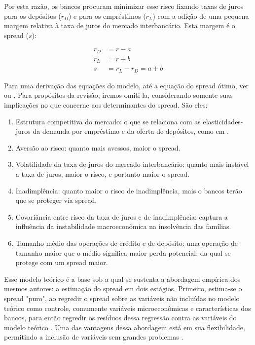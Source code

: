 \documentclass[a4paper,
               article,
               12pt,
               openany,
               oneside,
               english,
               brazil]{abntex2}
\numberwithin{equation}{section}
\begin{document}
    Por esta razão, os bancos procuram minimizar esse risco fixando taxas de juros para os depósitos ($r_D$) e para os empréstimos ($r_L$) com a adição de uma pequena margem relativa à taxa de juros do mercado interbancário. Esta margem é o spread ($s$):

	\begin{align}
        r_D &= r - a \\
        r_L &= r + b \\
        s &= r_L - r_D = a + b
	\end{align}

    Para uma derivação das equações do modelo, até a equação do spread ótimo, ver \textcite[p.~2262]{maudos} ou \textcite[p.~584]{hoesaunders}. Para propósitos da revisão, iremos omiti-la, considerando somente suas implicações no que concerne aos determinantes do spread. São eles:

	\begin{enumerate}
		\item Estrutura competitiva do mercado: o que se relaciona com as elasticidades-juros da demanda por empréstimo e da oferta de depósitos, como em \textcite{klein}.
		\item Aversão ao risco: quanto mais avessos, maior o spread.
		\item Volatilidade da taxa de juros do mercado interbancário: quanto mais instável a taxa de juros, maior o risco, e portanto maior o spread.
		\item Inadimplência: quanto maior o risco de inadimplência, mais o bancos terão que se proteger via spread.
		\item Covariância entre risco da taxa de juros e de inadimplência: captura a influência da instabilidade macroeconômica na insolvência das famílias.
		\item Tamanho médio das operações de crédito e de depósito: uma operação de tamanho maior que o médio significa maior perda potencial, da qual se protege com um spread maior.
	\end{enumerate}

    Esse modelo teórico é a base sob a qual se sustenta a abordagem empírica dos mesmos autores: a estimação do spread em dois estágios. Primeiro, estima-se o spread "puro", ao regredir o spread sobre as variáveis não incluídas no modelo teórico como controle, comumente variáveis microeconômicas e características dos bancos, para então regredir os resíduos dessa regressão contra as variáveis do modelo teórico \textcite{maudos}. Uma das vantagens dessa abordagem está em sua flexibilidade, permitindo a inclusão de variáveis sem grandes problemas \textcite[p.~2]{almeida15}.
\end{document}
